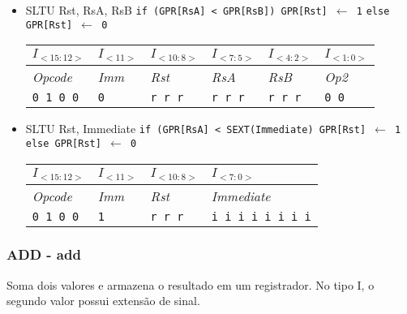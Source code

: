 \documentclass{extreport}
\begin{document}
\begin{itemize}
\item SLTU Rst, RsA, RsB
\subitem \texttt{if (GPR[RsA] < GPR[RsB]) GPR[Rst] $\leftarrow$ 1}
\subitem \texttt{else GPR[Rst] $\leftarrow$ 0}
\begin{table}[ht!]
\centering
\begin{tabular}{|p{1.6cm}|p{1.6cm}|p{1.6cm}|p{1.6cm}|p{1.6cm}|p{1.6cm}|}
\hline
$I_{<15:12>}$ & $I_{<11>}$ & $I_{<10:8>}$ & $I_{<7:5>}$ & $I_{<4:2>}$ & $I_{<1:0>}$ \\ \hline
\textit{Opcode} & \textit{Imm} & \textit{Rst} & \textit{RsA} & \textit{RsB} & \textit{Op2} \\ \hline
\texttt{0 1 0 0} & \texttt{0} & \texttt{r r r} & \texttt{r r r} & \texttt{r r r} & \texttt{0 0} \\ \hline
\end{tabular}
\end{table}

\item SLTU Rst, Immediate
\subitem \texttt{if (GPR[RsA] < SEXT(Immediate) GPR[Rst] $\leftarrow$ 1}
\subitem \texttt{else GPR[Rst] $\leftarrow$ 0}
\begin{table}[ht!]
\centering
\begin{tabular}{|p{1.6cm}|p{1.6cm}|p{1.6cm}|p{5.65cm}|}
\hline
$I_{<15:12>}$ & $I_{<11>}$ & $I_{<10:8>}$ & $I_{<7:0>}$ \\ \hline
\textit{Opcode} & \textit{Imm} & \textit{Rst} & \textit{Immediate} \\ \hline
\texttt{0 1 0 0} & \texttt{1} & \texttt{r r r} & \texttt{i i i i i i i i} \\ \hline
\end{tabular}
\end{table}
\end{itemize}

\subsubsection{ADD - add}
Soma dois valores e armazena o resultado em um registrador. No tipo I, o segundo valor possui extensão de sinal.
\end{document}
